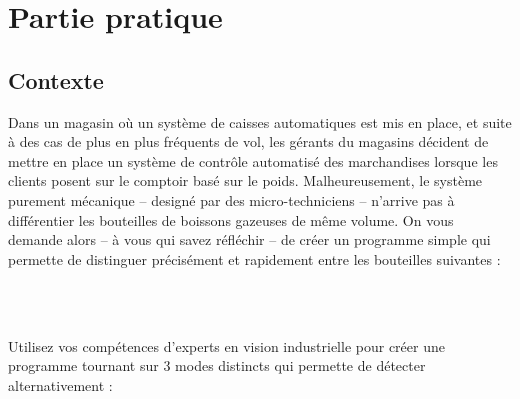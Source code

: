 \section{Partie pratique}

\subsection{Contexte}
Dans un magasin où un système de caisses automatiques est mis en place, et suite à des cas de plus en plus fréquents de vol, les gérants du magasins décident de mettre en place un système de contrôle automatisé des marchandises lorsque les clients posent sur le comptoir basé sur le poids. Malheureusement, le système purement mécanique -- designé par des micro-techniciens -- n'arrive pas à différentier les bouteilles de boissons gazeuses de même volume. On vous demande alors -- à vous qui savez réfléchir -- de créer un programme simple qui permette de distinguer précisément et rapidement entre les bouteilles suivantes :

\vspace{0.2cm}
\noindent
\begin{minipage}[c]{\textwidth}
  \centering
  \\
  \label{fig.Bouteilles}
\end{minipage}\\

\vspace{0.2cm}
Utilisez vos compétences d'experts en vision industrielle pour créer une programme tournant sur 3 modes distincts qui permette de détecter alternativement :

